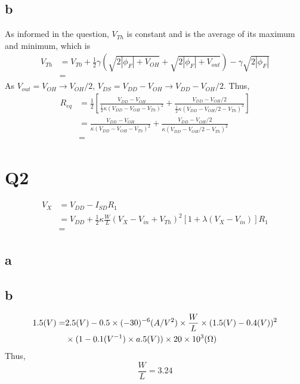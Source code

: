 \documentclass[a4paper,10pt]{article}
\begin{document}
\subsection*{b}
As informed in the question, \begin{math}V_{Th}\end{math} is constant and is the average of its maximum and minimum, which is
\begin{equation}
\begin{split}
V_{Th} &= V_{T0} + \frac{1}{2}\gamma(\sqrt{2|\phi_F| + V_{OH}} + \sqrt{2|\phi_F| + V_{out}}) -\gamma\sqrt{2|\phi_F|}\\
&=
\end{split}
\end{equation}
As \begin{math}V_{out} = V_{OH} \rightarrow V_{OH}/2\end{math}, \begin{math}V_{DS} = V_{DD} - V_{OH} \rightarrow V_{DD} -
V_{OH}/2\end{math}. Thus,
\begin{equation}
\begin{split}
R_{eq} &= \frac{1}{2}\left[ \frac{V_{DD} - V_{OH}}{\frac{1}{2}\kappa(V_{DD}-V_{OH}-V_{Th}) ^2} + \frac{V_{DD} - V_{OH}/2}{\frac{1}{2}\kappa(V_{DD}-V_{OH}/2-V_{Th}) ^2}\right]\\
&= \frac{V_{DD} - V_{OH}}{\kappa(V_{DD}-V_{OH}-V_{Th}) ^2} + \frac{V_{DD} - V_{OH}/2}{\kappa(V_{DD}-V_{OH}/2-V_{Th}) ^2}\\
&=
\end{split}
\end{equation}

\section*{Q2}
\begin{equation}
\begin{split}
V_X &= V_{DD} - I_{SD}R_1\\
&= V_{DD} + \frac{1}{2}\kappa\frac{W}{L}(V_X-V_{in}+V_{Th})^2 [1+\lambda (V_X - V_{in})]R_1\\
&=
\end{split}
\end{equation}
\subsection*{a}
\subsection*{b}
\begin{equation}
\begin{split}
1.5(V) = &2.5(V) - 0.5\times (-30)\time 10^{-6} (A/V^2) \times\frac{W}{L}\times (1.5(V) - 0.4(V))^2 \\
 & \times (1-0.1(V^{-1}) \times a.5(V))\times 20\times 10^3 (\Omega)
\end{split}
\end{equation}
Thus,
\begin{equation}
\frac{W}{L}=3.24
\end{equation}
\end{document}
